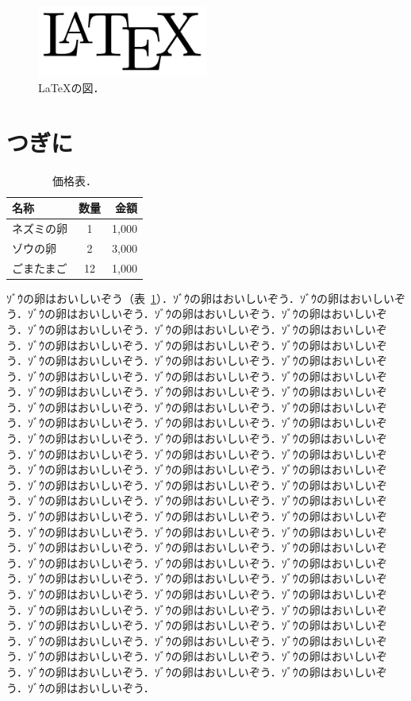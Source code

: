 \documentclass[
	10pt,
	a4j,		%
	twocolumn,	%
	uplatex
]{jsarticle}
\begin{document}
\begin{figure}[t]
	\centering
	\includegraphics[clip,width=0.5\textwidth]{fig/LaTeX.pdf}
	\caption{
		\LaTeX{}の図．
		\label{fig:latex}
	}
\end{figure}

\section{つぎに}
\begin{table}[t]
	\centering
	\caption{
		価格表．
		\label{tab:egg}
	}
	\begin{tabular}{l|cr}
		名称    &   数量  &   金額 \\
		\hline
		ネズミの卵   &   1    &   1,000 \\
		ゾウの卵   &   2    &   3,000 \\
		ごまたまご &	12 & 1,000
	\end{tabular}
\end{table}

ｿﾞｳの卵はおいしいぞう（表~\ref{tab:egg}）．ｿﾞｳの卵はおいしいぞう．ｿﾞｳの卵はおいしいぞう．ｿﾞｳの卵はおいしいぞう．ｿﾞｳの卵はおいしいぞう．ｿﾞｳの卵はおいしいぞう．ｿﾞｳの卵はおいしいぞう．ｿﾞｳの卵はおいしいぞう．ｿﾞｳの卵はおいしいぞう．ｿﾞｳの卵はおいしいぞう．ｿﾞｳの卵はおいしいぞう．ｿﾞｳの卵はおいしいぞう．ｿﾞｳの卵はおいしいぞう．ｿﾞｳの卵はおいしいぞう．ｿﾞｳの卵はおいしいぞう．ｿﾞｳの卵はおいしいぞう．ｿﾞｳの卵はおいしいぞう．ｿﾞｳの卵はおいしいぞう．ｿﾞｳの卵はおいしいぞう．ｿﾞｳの卵はおいしいぞう．ｿﾞｳの卵はおいしいぞう．ｿﾞｳの卵はおいしいぞう．ｿﾞｳの卵はおいしいぞう．ｿﾞｳの卵はおいしいぞう．ｿﾞｳの卵はおいしいぞう．ｿﾞｳの卵はおいしいぞう．ｿﾞｳの卵はおいしいぞう．ｿﾞｳの卵はおいしいぞう．ｿﾞｳの卵はおいしいぞう．ｿﾞｳの卵はおいしいぞう．ｿﾞｳの卵はおいしいぞう．ｿﾞｳの卵はおいしいぞう．ｿﾞｳの卵はおいしいぞう．ｿﾞｳの卵はおいしいぞう．ｿﾞｳの卵はおいしいぞう．ｿﾞｳの卵はおいしいぞう．ｿﾞｳの卵はおいしいぞう．ｿﾞｳの卵はおいしいぞう．ｿﾞｳの卵はおいしいぞう．ｿﾞｳの卵はおいしいぞう．ｿﾞｳの卵はおいしいぞう．ｿﾞｳの卵はおいしいぞう．ｿﾞｳの卵はおいしいぞう．ｿﾞｳの卵はおいしいぞう．ｿﾞｳの卵はおいしいぞう．ｿﾞｳの卵はおいしいぞう．ｿﾞｳの卵はおいしいぞう．ｿﾞｳの卵はおいしいぞう．ｿﾞｳの卵はおいしいぞう．ｿﾞｳの卵はおいしいぞう．ｿﾞｳの卵はおいしいぞう．ｿﾞｳの卵はおいしいぞう．ｿﾞｳの卵はおいしいぞう．ｿﾞｳの卵はおいしいぞう．ｿﾞｳの卵はおいしいぞう．ｿﾞｳの卵はおいしいぞう．ｿﾞｳの卵はおいしいぞう．ｿﾞｳの卵はおいしいぞう．ｿﾞｳの卵はおいしいぞう．ｿﾞｳの卵はおいしいぞう．ｿﾞｳの卵はおいしいぞう．ｿﾞｳの卵はおいしいぞう．ｿﾞｳの卵はおいしいぞう．ｿﾞｳの卵はおいしいぞう．ｿﾞｳの卵はおいしいぞう．ｿﾞｳの卵はおいしいぞう．ｿﾞｳの卵はおいしいぞう．ｿﾞｳの卵はおいしいぞう．ｿﾞｳの卵はおいしいぞう．ｿﾞｳの卵はおいしいぞう．ｿﾞｳの卵はおいしいぞう．ｿﾞｳの卵はおいしいぞう．ｿﾞｳの卵はおいしいぞう．ｿﾞｳの卵はおいしいぞう．ｿﾞｳの卵はおいしいぞう．ｿﾞｳの卵はおいしいぞう．
\end{document}
